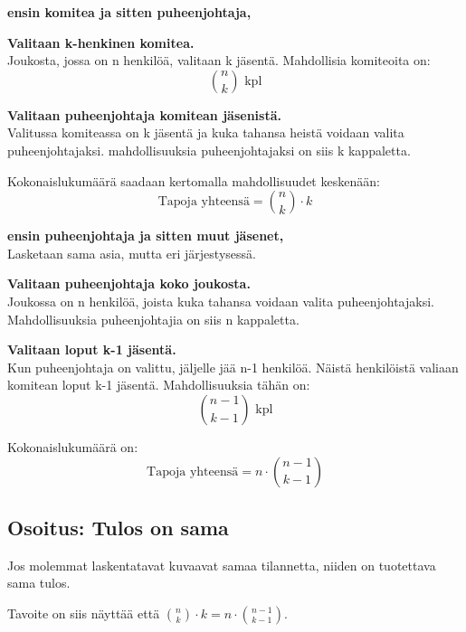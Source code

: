 \documentclass[12pt,a4paper]{article}
\begin{document}
\begin{kohta}
  \item \textbf{ensin komitea ja sitten puheenjohtaja,}

\begin{alakohta}
    \item \textbf{Valitaan k-henkinen komitea.} \\
    Joukosta, jossa on n henkilöä, valitaan k jäsentä. Mahdollisia komiteoita on:
    \[
    \binom{n}{k} \text{ kpl}
    \]

    \item \textbf{Valitaan puheenjohtaja komitean jäsenistä.} \\
    Valitussa komiteassa on k jäsentä ja kuka tahansa heistä voidaan valita puheenjohtajaksi. mahdollisuuksia puheenjohtajaksi on siis k kappaletta.
\end{alakohta}

Kokonaislukumäärä saadaan kertomalla mahdollisuudet keskenään:
\[
\text{Tapoja yhteensä} = \binom{n}{k} \cdot k
\]


\item \textbf{ensin puheenjohtaja ja sitten muut jäsenet,}\\
Lasketaan sama asia, mutta eri järjestysessä.

\begin{alakohta}
    \item \textbf{Valitaan puheenjohtaja koko joukosta.} \\
    Joukossa on n henkilöä, joista kuka tahansa voidaan valita puheenjohtajaksi.
    Mahdollisuuksia puheenjohtajia on siis n kappaletta.
    
    \item \textbf{Valitaan loput k-1 jäsentä.} \\
    Kun puheenjohtaja on valittu, jäljelle jää n-1 henkilöä. Näistä henkilöistä
    valiaan komitean loput k-1 jäsentä. Mahdollisuuksia tähän on:
    \[
    \binom{n-1}{k-1} \text{ kpl}
    \]
\end{alakohta}

Kokonaislukumäärä on:
\[
\text{Tapoja yhteensä} = n \cdot \binom{n-1}{k-1}
\]
\pagebreak


\subsection*{Osoitus: Tulos on sama}
Jos molemmat laskentatavat kuvaavat samaa tilannetta, niiden on tuotettava sama tulos.

Tavoite on siis näyttää että $\displaystyle \binom{n}{k} \cdot k = n \cdot \binom{n-1}{k-1}$.


\end{kohta}
\end{document}
